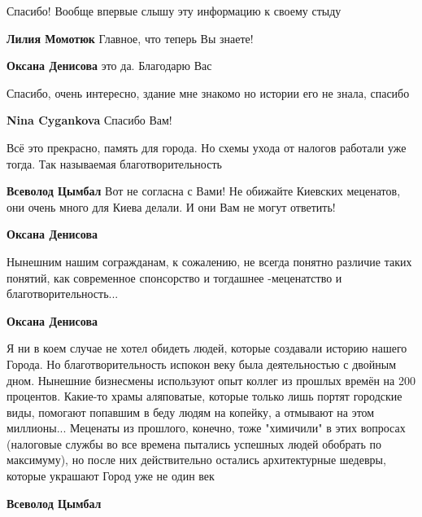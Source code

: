\begin{itemize}

Спасибо! Вообще впервые слышу эту информацию к своему стыду

\begin{itemize} %
\textbf{Лилия Момотюк} Главное, что теперь Вы знаете!

\textbf{Оксана Денисова} это да. Благодарю Вас
\end{itemize} %

Спасибо, очень интересно, здание мне знакомо но истории его не знала, спасибо

\begin{itemize} %
\textbf{Nina Cygankova} Спасибо Вам!
\end{itemize} %


Всё это прекрасно, память для города. Но схемы ухода от налогов работали уже
тогда. Так называемая благотворительность

\begin{itemize} %
\textbf{Всеволод Цымбал} Вот не согласна с Вами! Не обижайте Киевских меценатов, они очень много для Киева делали. И они Вам не могут ответить!

\begin{itemize} %
\textbf{Оксана Денисова} 

Нынешним нашим согражданам, к сожалению, не всегда понятно различие таких
понятий, как современное спонсорство и тогдашнее -меценатство и
благотворительность...


\textbf{Оксана Денисова} 

Я ни в коем случае не хотел обидеть людей, которые создавали историю нашего
Города. Но благотворительность испокон веку была деятельностью с двойным дном.
Нынешние бизнесмены используют опыт коллег из прошлых времён на 200 процентов.
Какие-то храмы аляповатые, которые только лишь портят городские виды, помогают
попавшим в беду людям на копейку, а отмывают на этом миллионы... Меценаты из
прошлого, конечно, тоже "химичили" в этих вопросах (налоговые службы во все
времена пытались успешных людей обобрать по максимуму), но после них
действительно остались архитектурные шедевры, которые украшают Город уже не
один век

\end{itemize} %

\textbf{Всеволод Цымбал} 


\end{itemize}
\end{itemize}

